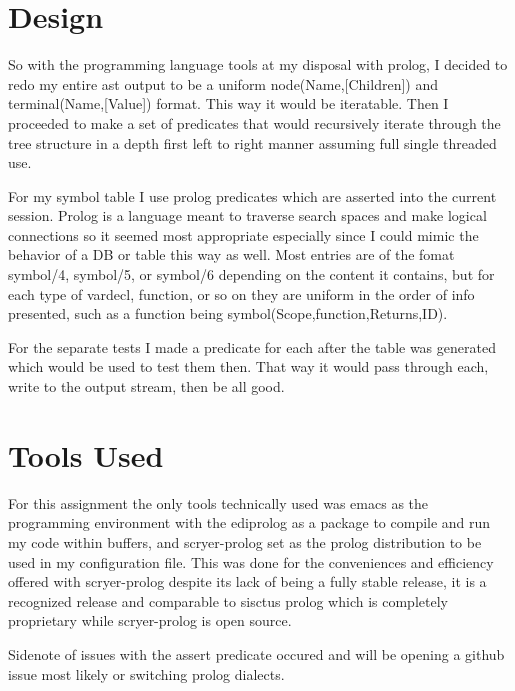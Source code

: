 \documentclass{article}
\begin{document}
\section{Design}
So with the programming language tools at my disposal with prolog, I decided to redo my entire ast output to be a uniform node(Name,[Children]) and terminal(Name,[Value]) format. This way it would be iteratable. Then I proceeded to make a set of predicates that would recursively iterate through the tree structure in a depth first left to right manner assuming full single threaded use.

For my symbol table I use prolog predicates which are asserted into the current session. Prolog is a language meant to traverse search spaces and make logical connections so it seemed most appropriate especially since I could mimic the behavior of a DB or table this way as well. Most entries are of the fomat symbol/4, symbol/5, or symbol/6 depending on the content it contains, but for each type of vardecl, function, or so on they are uniform in the order of info presented, such as a function being symbol(Scope,function,Returns,ID).

For the separate tests I made a predicate for each after the table was generated which would be used to test them then. That way it would pass through each, write to the output stream, then be all good.

\section{Tools Used}
For this assignment the only tools technically used was emacs as the programming environment with the ediprolog as a package to compile and run my code within buffers, and scryer-prolog set as the prolog distribution to be used in my configuration file. This was done for the conveniences and efficiency offered with scryer-prolog despite its lack of being a fully stable release, it is a recognized release and comparable to sisctus prolog which is completely proprietary while scryer-prolog is open source.

Sidenote of issues with the assert predicate occured and will be opening a github issue most likely or switching prolog dialects.
\end{document}
